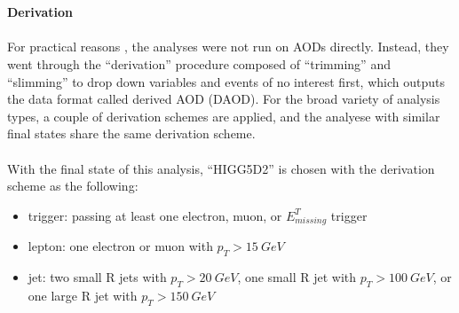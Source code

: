 \noindent
\\
\\{\bf Derivation}
\\
\\For practical reasons , the analyses were not run on AODs directly. Instead, they went through the ``derivation'' procedure composed of ``trimming'' and ``slimming'' to drop down variables and events of no interest first\cite{Borodin:2015wqa}, which outputs the data format called derived AOD (DAOD). For the broad variety of analysis types, a couple of derivation schemes are applied, and the analyese with similar final states share the same derivation scheme. 
\\
\\With the final state of this analysis, ``HIGG5D2'' is chosen with the derivation scheme as the following:
\begin{itemize}
  \item trigger: passing at least one electron, muon, or $E^{T}_{missing}$ trigger
  \item lepton: one electron or muon with $p_{T}>15~GeV$ 
  \item jet: two small R jets with $p_{T}>20~GeV$, one  small R jet with $p_{T}>100~GeV$, or one large R jet with $p_{T}>150~GeV$
\end{itemize}

